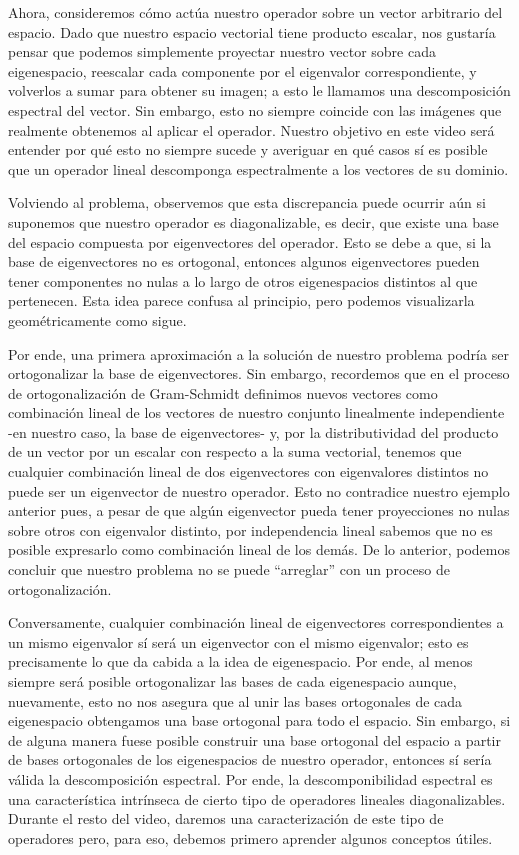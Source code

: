 \documentclass[12pt,dvipsnames]{article}
\numberwithin{equation}{section}
\begin{document}
Ahora, consideremos cómo actúa nuestro operador sobre un vector arbitrario del espacio. Dado que nuestro espacio vectorial tiene producto escalar, nos gustaría pensar que podemos simplemente proyectar nuestro vector sobre cada eigenespacio, reescalar cada componente por el eigenvalor correspondiente, y volverlos a sumar para obtener su imagen; a esto le llamamos una descomposición espectral del vector. Sin embargo, esto no siempre coincide con las imágenes que realmente obtenemos al aplicar el operador. Nuestro objetivo en este video será entender por qué esto no siempre sucede y averiguar en qué casos sí es posible que un operador lineal descomponga espectralmente a los vectores de su dominio.

Volviendo al problema, observemos que esta discrepancia puede ocurrir aún si suponemos que nuestro operador es diagonalizable, es decir, que existe una base del espacio compuesta por eigenvectores del operador. Esto se debe a que, si la base de eigenvectores no es ortogonal, entonces algunos eigenvectores pueden tener componentes no nulas a lo largo de otros eigenespacios distintos al que pertenecen. Esta idea parece confusa al principio, pero podemos visualizarla geométricamente como sigue.

Por ende, una primera aproximación a la solución de nuestro problema podría ser ortogonalizar la base de eigenvectores. Sin embargo, recordemos que en el proceso de ortogonalización de Gram-Schmidt definimos nuevos vectores como combinación lineal de los vectores de nuestro conjunto linealmente independiente -en nuestro caso, la base de eigenvectores- y, por la distributividad del producto de un vector por un escalar con respecto a la suma vectorial, tenemos que cualquier combinación lineal de dos eigenvectores con eigenvalores distintos no puede ser un eigenvector de nuestro operador. Esto no contradice nuestro ejemplo anterior pues, a pesar de que algún eigenvector pueda tener proyecciones no nulas sobre otros con eigenvalor distinto, por independencia lineal sabemos que no es posible expresarlo como combinación lineal de los demás. De lo anterior, podemos concluir que nuestro problema no se puede ``arreglar'' con un proceso de ortogonalización.

Conversamente, cualquier combinación lineal de eigenvectores correspondientes a un mismo eigenvalor sí será un eigenvector con el mismo eigenvalor; esto es precisamente lo que da cabida a la idea de eigenespacio. Por ende, al menos siempre será posible ortogonalizar las bases de cada eigenespacio aunque, nuevamente, esto no nos asegura que al unir las bases ortogonales de cada eigenespacio obtengamos una base ortogonal para todo el espacio. Sin embargo, si de alguna manera fuese posible construir una base ortogonal del espacio a partir de bases ortogonales de los eigenespacios de nuestro operador, entonces sí sería válida la descomposición espectral. Por ende, la descomponibilidad espectral es una característica intrínseca de cierto tipo de operadores lineales diagonalizables. Durante el resto del video, daremos una caracterización de este tipo de operadores pero, para eso, debemos primero aprender algunos conceptos útiles.
\end{document}
